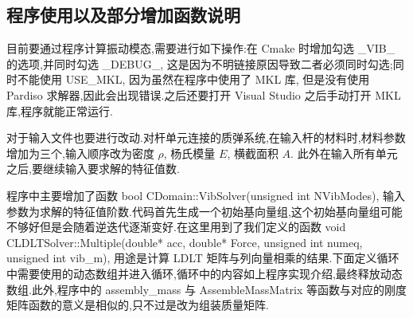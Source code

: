 \subsection{程序使用以及部分增加函数说明}
目前要通过程序计算振动模态,需要进行如下操作:在 Cmake 时增加勾选 \_VIB\_ 的选项,并同时勾选 \_DEBUG\_, 这是因为不明链接原因导致二者必须同时勾选;同时不能使用 USE\_MKL, 因为虽然在程序中使用了 MKL 库, 但是没有使用 Pardiso 求解器,因此会出现错误.之后还要打开 Visual Studio 之后手动打开 MKL 库,程序就能正常运行.

对于输入文件也要进行改动.对杆单元连接的质弹系统,在输入杆的材料时,材料参数增加为三个,输入顺序改为密度 $\rho$, 杨氏模量 $E$, 横截面积 $A$. 此外在输入所有单元之后,要继续输入要求解的特征值数.

程序中主要增加了函数 bool CDomain::VibSolver(unsigned int NVibModes), 输入参数为求解的特征值阶数.代码首先生成一个初始基向量组,这个初始基向量组可能不够好但是会随着逆迭代逐渐变好.在这里用到了我们定义的函数 void CLDLTSolver::Multiple(double* acc, double* Force, unsigned int numeq, unsigned int vib\_m), 用途是计算 LDLT 矩阵与列向量相乘的结果.下面定义循环中需要使用的动态数组并进入循环,循环中的内容如上程序实现介绍,最终释放动态数组.此外,程序中的 assembly\_mass 与 AssembleMassMatrix 等函数与对应的刚度矩阵函数的意义是相似的,只不过是改为组装质量矩阵.

